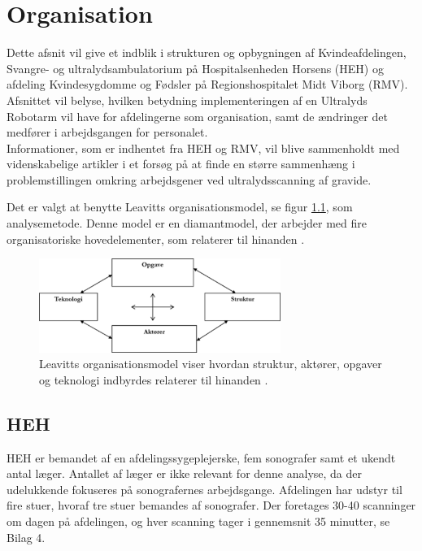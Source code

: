 \chapter{Organisation} \label{Organisation}
Dette afsnit vil give et indblik i strukturen og opbygningen af Kvindeafdelingen, Svangre- og ultralydsambulatorium på Hospitalsenheden Horsens (HEH) og afdeling Kvindesygdomme og Fødsler på Regionshospitalet Midt Viborg (RMV). Afsnittet vil belyse, hvilken betydning implementeringen af en Ultralyds Robotarm vil have for afdelingerne som organisation, samt de ændringer det medfører i arbejdsgangen for personalet. \\
Informationer, som er indhentet fra HEH og RMV, vil blive sammenholdt med videnskabelige artikler i et forsøg på at finde en større sammenhæng i problemstillingen omkring arbejdsgener ved ultralydsscanning af gravide. 

Det er valgt at benytte Leavitts organisationsmodel, se figur \ref{DiamantModel}, som analysemetode. Denne model er en diamantmodel, der arbejder med fire organisatoriske hovedelementer, som relaterer til hinanden \cite{Leavitt}\cite{diamantmodel}. 

\begin{figure}[h!]\centering
	\includegraphics[width = 0.7\textwidth]{Figurer/LeavittModel}
	\caption{Leavitts organisationsmodel viser hvordan struktur, aktører, opgaver og teknologi indbyrdes relaterer til hinanden \cite{diamantmodel}.}
	\label{DiamantModel}
\end{figure}

\section{HEH}
HEH er bemandet af en afdelingssygeplejerske, fem sonografer samt et ukendt antal læger. Antallet af læger er ikke relevant for denne analyse, da der udelukkende fokuseres på sonografernes arbejdsgange.
Afdelingen har udstyr til fire stuer, hvoraf tre stuer bemandes af sonografer. Der foretages 30-40 scanninger om dagen på afdelingen, og hver scanning tager i gennemsnit 35 minutter, se Bilag 4. 

